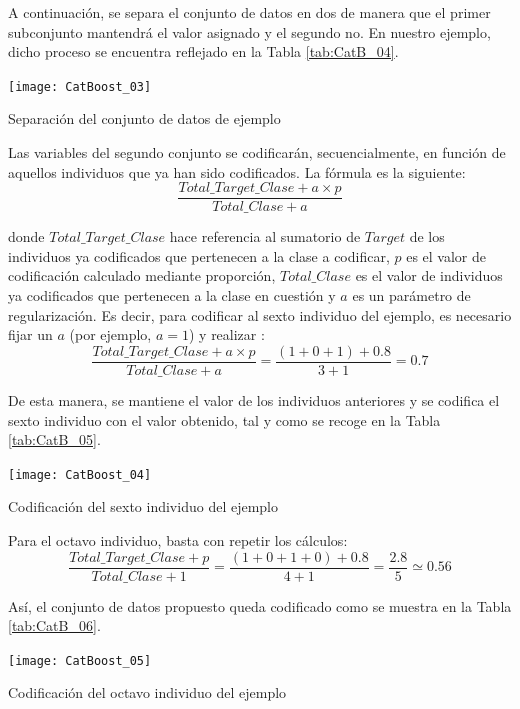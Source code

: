 \documentclass[12pt,twoside]{article}
\begin{document}
A continuación, se separa el conjunto de datos en dos de manera que el primer subconjunto mantendrá el valor asignado y el segundo no. En nuestro ejemplo, dicho proceso se encuentra reflejado en la Tabla \ref{tab:CatB_04}.
\begin{table}[h]
\centering
\texttt{[image: CatBoost\_03]}
\caption{Separación del conjunto de datos de ejemplo}
\label{tab:CatB_04}
\end{table}

Las variables del segundo conjunto se codificarán, secuencialmente, en función de aquellos individuos que ya han sido codificados. La fórmula es la siguiente:
\begin{equation*}
\frac{Total\_Target\_Clase + a\times p}{Total\_Clase + a}
\end{equation*}

\noindent
donde $Total\_Target\_Clase$ hace referencia al sumatorio de $Target$ de los individuos ya codificados que pertenecen a la clase a codificar, $p$ es el valor de codificación calculado mediante proporción, $Total\_Clase$ es el valor de individuos ya codificados que pertenecen a la clase en cuestión y $a$ es un parámetro de regularización. Es decir, para codificar al sexto individuo del ejemplo, es necesario fijar un $a$ (por ejemplo, $a=1$) y realizar :
\begin{equation*}
\frac{Total\_Target\_Clase + a \times p}{Total\_Clase + a} = \frac{(1 + 0 + 1) + 0.8}{3 + 1} = 0.7
\end{equation*}

De esta manera, se mantiene el valor de los individuos anteriores y se codifica el sexto individuo con el valor obtenido, tal y como se recoge en la Tabla \ref{tab:CatB_05}.
\begin{table}[H]
\centering
\texttt{[image: CatBoost\_04]}
\caption{Codificación del sexto individuo del ejemplo}
\label{tab:CatB_05}
\end{table}

Para el octavo individuo, basta con repetir los cálculos:
\begin{equation*}
\frac{Total\_Target\_Clase + p}{Total\_Clase + 1} = \frac{(1 + 0 + 1 + 0) + 0.8}{4 + 1} = \frac{2.8}{5} \simeq 0.56
\end{equation*}

Así, el conjunto de datos propuesto queda codificado como se muestra en la Tabla \ref{tab:CatB_06}.
\begin{table}[h]
\centering
\texttt{[image: CatBoost\_05]}
\caption{Codificación del octavo individuo del ejemplo}
\label{tab:CatB_06}
\end{table}
\end{document}
